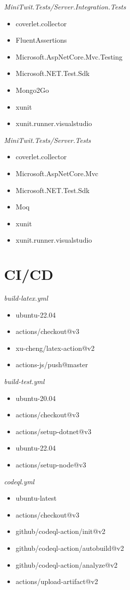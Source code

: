 \textit{MiniTwit.Tests/Server.Integration.Tests}
\begin{itemize}
   \item coverlet.collector 
   \item FluentAssertions  
   \item Microsoft.AspNetCore.Mvc.Testing    
   \item Microsoft.NET.Test.Sdk  
   \item Mongo2Go   
   \item xunit     
   \item xunit.runner.visualstudio  
\end{itemize}

\textit{MiniTwit.Tests/Server.Tests} 
\begin{itemize}
   \item coverlet.collector 
   \item Microsoft.AspNetCore.Mvc    
   \item Microsoft.NET.Test.Sdk  
   \item Moq   
   \item xunit     
   \item xunit.runner.visualstudio  
\end{itemize}


\section{CI/CD}
\label{appendix:CICDpdependencies}
\textit{build-latex.yml}
\begin{itemize}
    \item ubuntu-22.04
    \item actions/checkout@v3
    \item xu-cheng/latex-action@v2
    \item actions-js/push@master
\end{itemize}

\textit{build-test.yml}
\begin{itemize}
    \item ubuntu-20.04
    \item actions/checkout@v3
    \item actions/setup-dotnet@v3
    \item ubuntu-22.04
    \item actions/setup-node@v3
\end{itemize}

\textit{codeql.yml}
\begin{itemize}
    \item ubuntu-latest
    \item actions/checkout@v3
    \item github/codeql-action/init@v2
    \item github/codeql-action/autobuild@v2
    \item github/codeql-action/analyze@v2
    \item actions/upload-artifact@v2
\end{itemize}

